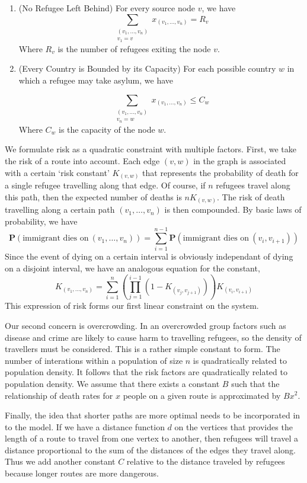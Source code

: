 \documentclass{article}
\begin{document}
\begin{enumerate}
    \item (No Refugee Left Behind) For every source node $v$, we have
    \[ \sum_{\substack{(v_1, \dots, v_n) \\ v_1 = v}} x_{(v_1, \dots, v_n)} = R_v \]
    Where $R_v$ is the number of refugees exiting the node $v$.

    \item (Every Country is Bounded by its Capacity) For each possible country $w$ in which a refugee may take asylum, we have
    
    \[ \sum_{\substack{(v_1, \dots, v_n) \\ v_n = w}} x_{(v_1, \dots, v_n)} \leq C_w \]
    Where $C_w$ is the capacity of the node $w$.
\end{enumerate}

We formulate risk as a quadratic constraint with multiple factors. First, we take the risk of a route into account. Each edge $(v,w)$ in the graph is associated with a certain `risk constant' $K_{(v,w)}$ that represents the probability of death for a single refugee travelling along that edge. Of course, if $n$ refugees travel along this path, then the expected number of deaths is $n K_{(v,w)}$. The risk of death travelling along a certain path $(v_1, \dots, v_n)$ is then compounded. By basic laws of probability, we have
%
\[ \mathbf{P}(\text{immigrant dies on}\ (v_1, \dots, v_n)) = \sum_{i = 1}^{n-1} \mathbf{P}(\text{immigrant dies on}\ (v_i, v_{i+1})) \]
%
Since the event of dying on a certain interval is obviously independant of dying on a disjoint interval, we have an analogous equation for the constant,
%
\[ K_{(v_1, \dots, v_n)} = \sum_{i = 1}^n \left( \prod_{j = 1}^{i-1} \left(1 - K_{(v_j,v_{j+1})} \right) \right) K_{(v_i, v_{i+1})} \]
%
This expression of risk forms our first linear constraint on the system.

Our second concern is overcrowding. In an overcrowded group factors such as disease and crime are likely to cause harm to travelling refugees, so the density of travellers must be considered. This is a rather simple constant to form. The number of interations within a population of size $n$ is quadratically related to population density. It follows that the risk factors are quadratically related to population density. We assume that there exists a constant $B$ such that the relationship of death rates for $x$ people on a given route is approximated by $Bx^2$. 

Finally, the idea that shorter paths are more optimal needs to be incorporated in to the model. If we have a distance function $d$ on the vertices that provides the length of a route to travel from one vertex to another, then refugees will travel a distance proportional to the sum of the distances of the edges they travel along. Thus we add another constant $C$ relative to the distance traveled by refugees because longer routes are more dangerous.
\end{document}

